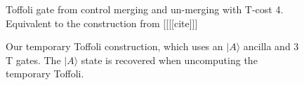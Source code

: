 \documentclass[twocolumn,longbibliography]{quantumarticle-customized}
\begin{document}
\begin{figure}
  \caption{
	Toffoli gate from control merging and un-merging with T-cost 4.
	Equivalent to the construction from [[[[cite]]]
  }
  \label{fig:ancilla-temporary-toffoli}
\end{figure}

\begin{figure}
  \caption{
	Our temporary Toffoli construction, which uses an $|A\rangle$ ancilla and 3 T gates.
	The $|A\rangle$ state is recovered when uncomputing the temporary Toffoli.
  }
  \label{fig:ancilla-temporary-toffoli}
\end{figure}
\end{document}
